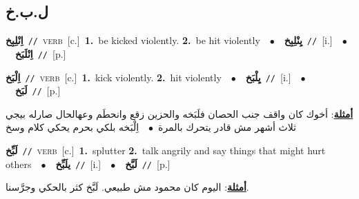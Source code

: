 \documentclass[10pt,a4paper,twoside]{article} %
\begin{document}
\begin{multicols}{2}
{{{{\vspace{-3mm}
\subsection*{\color{blue}\foreignlanguage{arabic}{ل.ب.خ}\color{blue}{}} 

{\setlength\topsep{0pt}\textbf{\foreignlanguage{arabic}{اِنْلِبِخ}}\ {\color{gray}\texttt{//}\color{black}}\ \textsc{verb}\ [c.]\ \textbf{1.}~be kicked violently.  \textbf{2.}~be hit violently\ \ $\bullet$\ \ \setlength\topsep{0pt}\textbf{\foreignlanguage{arabic}{يِنْلِبِخ}}\ {\color{gray}\texttt{//}\color{black}}\ [i.]\ \ $\bullet$\ \ \setlength\topsep{0pt}\textbf{\foreignlanguage{arabic}{اِنْلَبَخ}}\ {\color{gray}\texttt{//}\color{black}}\ [p.]\ 

{\setlength\topsep{0pt}\textbf{\foreignlanguage{arabic}{اِلْبَخ}}\ {\color{gray}\texttt{//}\color{black}}\ \textsc{verb}\ [c.]\ \textbf{1.}~kick violently.  \textbf{2.}~hit violently\ \ $\bullet$\ \ \setlength\topsep{0pt}\textbf{\foreignlanguage{arabic}{يِلْبَخ}}\ {\color{gray}\texttt{//}\color{black}}\ [i.]\ \ $\bullet$\ \ \setlength\topsep{0pt}\textbf{\foreignlanguage{arabic}{لَبَخ}}\ {\color{gray}\texttt{//}\color{black}}\ [p.]\  \begin{flushright}\color{gray}\foreignlanguage{arabic}{\textbf{\underline{\foreignlanguage{arabic}{أمثلة}}}: أخوك كان واقف جنب الحصان فلَبَخه والحزين زقع وانحطَم وعهالحال صارله بيجي ثلاث أشهر مش قادر يتحرك بالمرة\ $\bullet$\ \  اِلْبَخه بلكي بحرم يحكي كلام وسخ}\end{flushright}\color{black}} \vspace{2mm}

{\setlength\topsep{0pt}\textbf{\foreignlanguage{arabic}{لَبِّخ}}\ {\color{gray}\texttt{//}\color{black}}\ \textsc{verb}\ [c.]\ \textbf{1.}~splutter  \textbf{2.}~talk angrily and say things that might hurt others\ \ $\bullet$\ \ \setlength\topsep{0pt}\textbf{\foreignlanguage{arabic}{يلَبِّخ}}\ {\color{gray}\texttt{//}\color{black}}\ [i.]\ \ $\bullet$\ \ \setlength\topsep{0pt}\textbf{\foreignlanguage{arabic}{لَبَّخ}}\ {\color{gray}\texttt{//}\color{black}}\ [p.]\  \begin{flushright}\color{gray}\foreignlanguage{arabic}{\textbf{\underline{\foreignlanguage{arabic}{أمثلة}}}: اليوم كان محمود مش طبيعي. لَبَّخ كثر بالحكي وجرَّسنا.}\end{flushright}\color{black}} \vspace{2mm}

}}}}}
\end{multicols}
\end{document}
